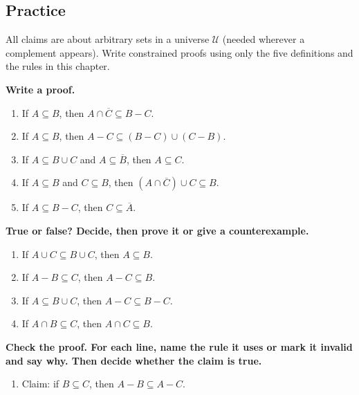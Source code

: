 \subsection{Practice}

All claims are about arbitrary sets in a universe $\mathcal{U}$ (needed wherever a complement appears). Write constrained proofs using only the five definitions and the rules in this chapter.

\textbf{Write a proof.}
\begin{enumerate}[label=\arabic*.,leftmargin=1.8em]
  \item If $A\subseteq B$, then $A\cap\overline{C}\subseteq B-C$.
  \item If $A\subseteq B$, then $A-C\subseteq (B-C)\cup(C-B)$.
  \item If $A\subseteq B\cup C$ and $A\subseteq\overline{B}$, then $A\subseteq C$.
  \item If $A\subseteq B$ and $C\subseteq B$, then $(A\cap\overline{C})\cup C\subseteq B$.
  \item If $A\subseteq B-C$, then $C\subseteq\overline{A}$.
\end{enumerate}

\textbf{True or false? Decide, then prove it or give a counterexample.}
\begin{enumerate}[label=\arabic*.,leftmargin=1.8em,resume]
  \item If $A\cup C\subseteq B\cup C$, then $A\subseteq B$.
  \item If $A-B\subseteq C$, then $A-C\subseteq B$.
  \item If $A\subseteq B\cup C$, then $A-C\subseteq B-C$.
  \item If $A\cap B\subseteq C$, then $A\cap C\subseteq B$.
\end{enumerate}

\textbf{Check the proof. For each line, name the rule it uses or mark it invalid and say why. Then decide whether the claim is true.}

\begin{enumerate}[label=\arabic*.,leftmargin=1.8em,resume]
  \item Claim: if $B\subseteq C$, then $A-B\subseteq A-C$.
\end{enumerate}

